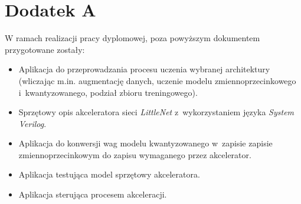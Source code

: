 

\chapter{Dodatek A}

W ramach realizacji pracy dyplomowej, poza powyższym dokumentem przygotowane zostały: 
\begin{itemize}

\item Aplikacja do przeprowadzania procesu uczenia wybranej architektury (wliczając m.in. augmentację danych, uczenie modelu zmiennoprzecinkowego i~kwantyzowanego, podział zbioru treningowego).

\item Sprzętowy opis akceleratora sieci \emph{LittleNet} z~wykorzystaniem języka \emph{System Verilog}.

\item Aplikacja do konwersji wag modelu kwantyzowanego w~zapisie zapisie zmiennoprzecinkowym do zapisu wymaganego przez akcelerator.

\item Aplikacja testująca model sprzętowy akceleratora.

\item Aplikacja sterująca procesem akceleracji.

\end{itemize}